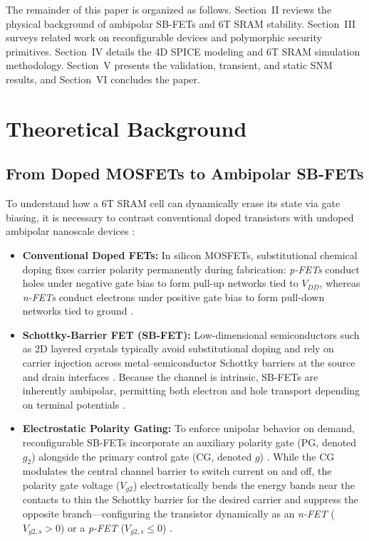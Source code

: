 \documentclass[conference]{IEEEtran}
\begin{document}
The remainder of this paper is organized as follows. Section~II reviews the physical background of ambipolar SB-FETs and 6T SRAM stability. Section~III surveys related work on reconfigurable devices and polymorphic security primitives. Section~IV details the 4D SPICE modeling and 6T SRAM simulation methodology. Section~V presents the validation, transient, and static SNM results, and Section~VI concludes the paper.

\section{Theoretical Background}
\subsection{From Doped MOSFETs to Ambipolar SB-FETs}
To understand how a 6T SRAM cell can dynamically erase its state via gate biasing, it is necessary to contrast conventional doped transistors with undoped ambipolar nanoscale devices \cite{sze2007, wu2021}:
\begin{itemize}
    \item \textbf{Conventional Doped FETs:} In silicon MOSFETs, substitutional chemical doping fixes carrier polarity permanently during fabrication: \textit{p-FETs} conduct holes under negative gate bias to form pull-up networks tied to $V_{DD}$, whereas \textit{n-FETs} conduct electrons under positive gate bias to form pull-down networks tied to ground \cite{sze2007, rabaey2003}.
    \item \textbf{Schottky-Barrier FET (SB-FET):} Low-dimensional semiconductors such as 2D layered crystals typically avoid substitutional doping and rely on carrier injection across metal--semiconductor Schottky barriers at the source and drain interfaces \cite{svensson2011, derycke2002, schwarz2023}. Because the channel is intrinsic, SB-FETs are inherently ambipolar, permitting both electron and hole transport depending on terminal potentials \cite{martel2001, wu2021}.
    \item \textbf{Electrostatic Polarity Gating:} To enforce unipolar behavior on demand, reconfigurable SB-FETs incorporate an auxiliary polarity gate (PG, denoted $g_2$) alongside the primary control gate (CG, denoted $g$) \cite{heinzig2012, demarchi2012, nakaharai2015}. While the CG modulates the central channel barrier to switch current on and off, the polarity gate voltage ($V_{g2}$) electrostatically bends the energy bands near the contacts to thin the Schottky barrier for the desired carrier and suppress the opposite branch---configuring the transistor dynamically as an \textit{n-FET} ($V_{g2,s} > 0$) or a \textit{p-FET} ($V_{g2,s} \le 0$) \cite{sun2021, wu2021}.
\end{itemize}
\end{document}
